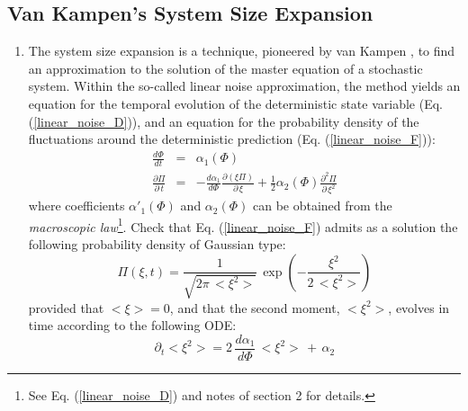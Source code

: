 \subsection{Van Kampen's System Size Expansion}
\begin{enumerate}
\item The system size expansion is a technique, pioneered by van Kampen  \citep{vankampen2011}, to find an approximation to the solution of the master equation of a stochastic system. Within the so-called linear noise approximation, the method yields an equation for the temporal evolution of the deterministic state variable (Eq. (\ref{linear_noise_D})), and an equation for the probability density of the fluctuations around the deterministic prediction (Eq. (\ref{linear_noise_F})):
\begin{eqnarray}
\label{linear_noise_D}
\frac{d\Phi}{dt}                & = &   \alpha_1(\Phi)  \\
\frac{\partial\Pi}{\partial\,t} & = & - \frac{d\alpha_1}{d\Phi}\frac{\partial(\xi\Pi)}{\partial\,\xi}+\frac{1}{2}\alpha_2(\Phi)\frac{\partial^2\Pi}{\partial\,\xi^2}
\label{linear_noise_F}
\end{eqnarray}
where coefficients $\alpha'_1(\Phi)$ and $\alpha_2(\Phi)$ can be obtained from the {\em macroscopic law}\footnote{See Eq. (\ref{linear_noise_D}) and notes of section 2 for details.}. Check that Eq. (\ref{linear_noise_F}) admits as a solution the following probability density of Gaussian type:
\begin{equation}
\label{Piofxit}
\Pi(\xi,t) = \frac{1}{\sqrt{2\pi\,<\xi^2>}}\,\exp \left(-\frac{\xi^2}{2\,<\xi^2>}\right)
\end{equation}
provided that $<\xi> = 0$, and that the second moment, $<\xi^2>$, evolves in time according to the following ODE:
\begin{equation}
\partial_t<\xi^2> = 2\,\frac{d\alpha_1}{d\Phi}\,<\xi^2> \,+\, \alpha_2 
\label{eq:xi}
\end{equation}


\end{enumerate}
